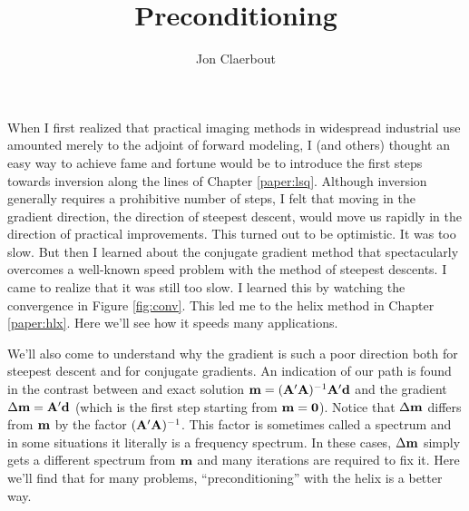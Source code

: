 
\def\sx#1{}
\def\bx#1{#1}
\def\eq{\quad =\quad}

\title{Preconditioning}
\author{Jon Claerbout}
\maketitle

\label{paper:prc}
\sx{precondition}



When I first realized that practical imaging methods in widespread
industrial use amounted merely to the adjoint of forward modeling,
I (and others) thought an easy way to achieve fame and fortune
would be to introduce the first steps towards inversion
along the lines of Chapter \ref{paper:lsq}.
Although inversion generally requires a prohibitive number
of steps, I felt that moving in the gradient direction,
the direction of steepest descent, would move us rapidly
in the direction of practical improvements.
This turned out to be optimistic.
It was too slow.
But then I learned about the conjugate gradient method that
spectacularly overcomes a well-known speed problem with the
method of steepest descents.
I came to realize that it was still too slow.
I learned this by watching the convergence in Figure
\ref{fig:conv}.
This led me to the helix method in Chapter \ref{paper:hlx}.
Here we'll see how it speeds many applications.

\par
We'll also come to understand why the gradient is such a poor direction
both for steepest descent and for conjugate gradients.
An indication of our path is found in the contrast between
and exact solution
$\bold m = (\bold A'\bold A)^{-1}\bold A'\bold d$ and the
gradient
$\Delta \bold m = \bold A'\bold d$
(which is the first step starting from $\bold m =\bold 0$).
Notice that $\Delta \bold m$ differs from $\bold m$
by the factor $(\bold A'\bold A)^{-1}$.
This factor is sometimes called a spectrum
and in some situations it literally is a frequency spectrum.
In these cases, $\Delta \bold m$ simply gets a different
spectrum from $\bold m$ and many iterations are required to fix it.
Here we'll find that for many problems,
``preconditioning'' with the helix is a better way.



